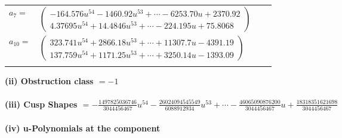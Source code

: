 \documentclass[1p]{elsarticle_modified}
\theoremstyle{definition}
\begin{document}
\begin{tabular}{m{7pt} m{180pt} m{7pt} m{180pt} }
\flushright $a_{7}=$&$\begin{pmatrix}-164.576 u^{54}-1460.92 u^{53}+\cdots-6253.70 u+2370.92\\4.37695 u^{54}+14.4846 u^{53}+\cdots-224.195 u+75.8068\end{pmatrix}$ \\
\flushright $a_{10}=$&$\begin{pmatrix}323.741 u^{54}+2866.18 u^{53}+\cdots+11307.7 u-4391.19\\137.759 u^{54}+1171.25 u^{53}+\cdots+3250.14 u-1393.09\end{pmatrix}$\\&\end{tabular}
\flushleft \textbf{(ii) Obstruction class $= -1$}\\~\\
\flushleft \textbf{(iii) Cusp Shapes $= -\frac{1497825036746}{3044456467} u^{54}-\frac{26024094545549}{6088912934} u^{53}+\cdots-\frac{46065090876200}{3044456467} u+\frac{18318351621698}{3044456467}$}\\~\\
\newpage\renewcommand{\arraystretch}{1}
\flushleft \textbf{(iv) u-Polynomials at the component}\newline \\
\end{document}
